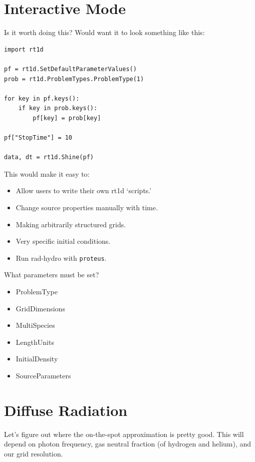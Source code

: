 \documentclass[letterpaper,titlepage,12pt]{article}
\numberwithin{equation}{section}
\begin{document}
\section{Interactive Mode}
Is it worth doing this?  Would want it to look something like this:

\begin{verbatim}
import rt1d

pf = rt1d.SetDefaultParameterValues()
prob = rt1d.ProblemTypes.ProblemType(1)

for key in pf.keys():
    if key in prob.keys():
        pf[key] = prob[key]

pf["StopTime"] = 10

data, dt = rt1d.Shine(pf)   
\end{verbatim}    

This would make it easy to:
\begin{itemize}
    \item Allow users to write their own rt1d `scripts.'
    \item Change source properties manually with time.
    \item Making arbitrarily structured grids.
    \item Very specific initial conditions.
    \item Run rad-hydro with \texttt{proteus}.
\end{itemize}    

What parameters must be set?
\begin{itemize}
    \item ProblemType
    \item GridDimensions
    \item MultiSpecies
    \item LengthUnits
    \item InitialDensity
    \item SourceParameters
\end{itemize}

\section{Diffuse Radiation}
Let's figure out where the on-the-spot approximation is pretty good.  This will depend on photon frequency, gas neutral fraction (of hydrogen and helium), and our grid resolution.
\end{document}
